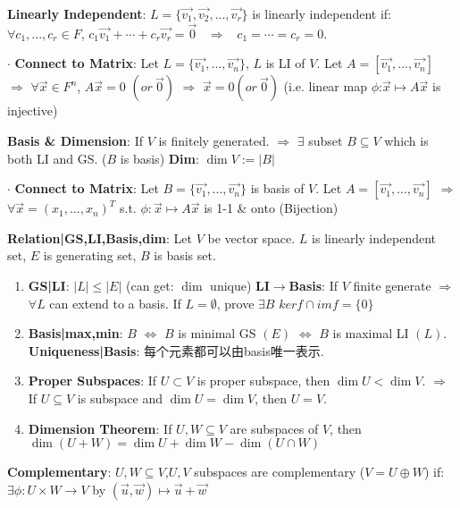 \documentclass[9pt]{article}
\begin{document}
\textbf{Linearly Independent}: $L=\{\vec{v_1},\vec{v_2},...,\vec{v_r}\}$ is linearly independent if: \ $\forall c_1,...,c_r\in F$, $c_1\vec{v_1}+\cdots+c_r\vec{v_r}=\vec{0}$ \ $\Rightarrow$ \ $c_1=\cdots =c_r=0$.

$\cdot$ \textbf{Connect to Matrix}: {\footnotesize Let $L=\{\vec{v_1},...,\vec{v_n}\}$, $L$ is LI of $V$. Let $A=[\vec{v_1},...,\vec{v_n}]$ $\Rightarrow$ $\forall\vec{x}\in F^n$, $A\vec{x}=0$ $(or \ \vec{0})$ $\Rightarrow$ $\vec{x}=0 (or \ \vec{0})$ (i.e. linear map $\phi$:$\vec{x}\mapsto A\vec{x}$ is injective)}

\textbf{Basis \& Dimension}: If $V$ is finitely generated. $\Rightarrow$ $\exists$ subset $B\subseteq V$ which is both LI and GS. ($B$ is basis) \quad \textbf{Dim}: $\dim V:=|B|$

$\cdot$ \textbf{Connect to Matrix}: {\footnotesize Let $B=\{\vec{v_1},...,\vec{v_n}\}$ is basis of $V$. Let $A=[\vec{v_1},...,\vec{v_n}]$ $\Rightarrow$ $\forall\vec{x}=(x_1,...,x_n)^T$ s.t. $\phi:\vec{x}\mapsto A\vec{x}$ is 1-1 \& onto (Bijection)}

\textbf{Relation|GS,LI,Basis,dim}: {\small Let $V$ be vector space. $L$ is linearly independent set, $E$ is generating set, $B$ is basis set.}

\begin{enumerate}[itemsep=-2pt, topsep=-2pt]
    \item \textbf{GS|LI}: $|L|\leq|E|$ {\scriptsize (can get: $\dim$ unique)} \quad \textbf{LI$\to$Basis}: If $V$ finite generate $\Rightarrow$ $\forall L$ can extend to a basis. {\scriptsize If $L=\emptyset$, prove $\exists B$} \quad \quad $ker f\cap im f=\{0\}$
    \item \textbf{Basis|max,min}: $B$ $\Leftrightarrow$ $B$ is minimal GS $(E)$ $\Leftrightarrow$ $B$ is maximal LI $(L)$. \quad \textbf{Uniqueness|Basis}: {\small 每个元素都可以由basis唯一表示.}
    \item \textbf{Proper Subspaces}: {\small If $U\subset V$ is proper subspace, then $\dim U<\dim V$. \quad $\Rightarrow$ \quad If $U\subseteq V$ is subspace and $\dim U=\dim V$, then $U=V$.}
    \item \textbf{Dimension Theorem}: If $U,W\subseteq V$ are subspaces of $V$, then $\dim(U+W)=\dim U+\dim W-\dim(U\cap W)$
\end{enumerate}

\textbf{Complementary}: $U,W\subseteq V$,$U,V$ subspaces are complementary ($V=U\oplus W$) if: \quad $\exists\phi:U\times W\to V$ by $(\vec{u},\vec{w})\mapsto\vec{u}+\vec{w}$
\end{document}
